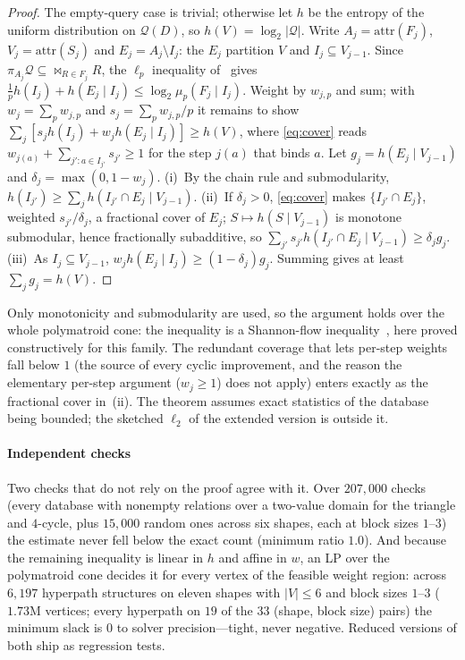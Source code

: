 \documentclass[conference]{IEEEtran}
\newcommand{\query}{\mathcal{Q}}
\newcommand{\rel}{R}
\newcommand{\block}{F}
\newcommand{\interface}{I}
\newcommand{\joinstate}{S}
\newcommand{\muLp}[3]{\mu_{#1}(#2 \mid #3)}
\newcommand{\attr}[1]{\text{attr}(#1)}
\begin{document}
\begin{proof}
The empty-query case is trivial; otherwise let $h$ be the entropy of the uniform distribution on $\query(D)$, so
$h(V)=\log_2|\query|$. Write $A_j=\attr{\block_j}$,
$V_j=\attr{\joinstate_j}$ and $E_j=A_j\setminus\interface_j$: the $E_j$
partition $V$ and $\interface_j\subseteq V_{j-1}$. Since
$\pi_{A_j}\query\subseteq\bowtie_{\rel\in\block_j}\rel$, the $\ell_p$
inequality of~\cite{abokhamis2024lpnorm} gives
$\frac1p h(\interface_j)+h(E_j\mid\interface_j)\le
\log_2\muLp{p}{\block_j}{\interface_j}$. Weight by $w_{j,p}$ and sum; with
$w_j=\sum_p w_{j,p}$ and $s_j=\sum_p w_{j,p}/p$ it remains to show
$\sum_j[s_jh(\interface_j)+w_jh(E_j\mid\interface_j)]\ge h(V)$, where
\eqref{eq:cover} reads $w_{j(a)}+\sum_{j':a\in\interface_{j'}}s_{j'}\ge1$
for the step $j(a)$ that binds $a$. Let $g_j=h(E_j\mid V_{j-1})$ and
$\delta_j=\max(0,1-w_j)$. (i)~By the chain rule and submodularity,
$h(\interface_{j'})\ge\sum_j h(\interface_{j'}\cap E_j\mid V_{j-1})$.
(ii)~If $\delta_j>0$, \eqref{eq:cover} makes
$\{\interface_{j'}\cap E_j\}$, weighted $s_{j'}/\delta_j$, a fractional
cover of $E_j$; $S\mapsto h(S\mid V_{j-1})$ is monotone submodular, hence
fractionally subadditive, so
$\sum_{j'}s_{j'}h(\interface_{j'}\cap E_j\mid V_{j-1})\ge\delta_jg_j$.
(iii)~As $\interface_j\subseteq V_{j-1}$,
$w_jh(E_j\mid\interface_j)\ge(1-\delta_j)g_j$. Summing gives at least
$\sum_jg_j=h(V)$.
\end{proof}

Only monotonicity and submodularity are used, so the argument holds over
the whole polymatroid cone: the inequality is a Shannon-flow inequality~\cite{abokhamis2017panda}, here proved constructively for this
family. The redundant coverage that lets per-step
weights fall below $1$ (the source of every cyclic improvement, and the
reason the elementary per-step argument ($w_j\ge1$) does not apply) enters
exactly as the fractional cover in~(ii). The theorem assumes exact
statistics of the database being bounded; the sketched $\ell_2$ of the
extended version is outside it.

\paragraph{Independent checks} Two checks that do not rely on the proof
agree with it. Over $207{,}000$ checks (every database with nonempty relations over a two-value domain for the triangle and $4$-cycle, plus $15{,}000$ random ones across six shapes, each at block sizes $1$--$3$) the estimate never fell
below the exact count (minimum ratio $1.0$). And because the remaining
inequality is linear in $h$ and affine in $w$, an LP over the polymatroid
cone decides it for every vertex of the feasible weight region: across
$6{,}197$ hyperpath structures on eleven shapes with $|V|\le6$ and block
sizes $1$--$3$ ($1.73$M vertices; every hyperpath on $19$ of the $33$
(shape, block size) pairs) the minimum slack is $0$ to solver precision---tight, never negative. Reduced versions of both ship as regression tests.
\end{document}
